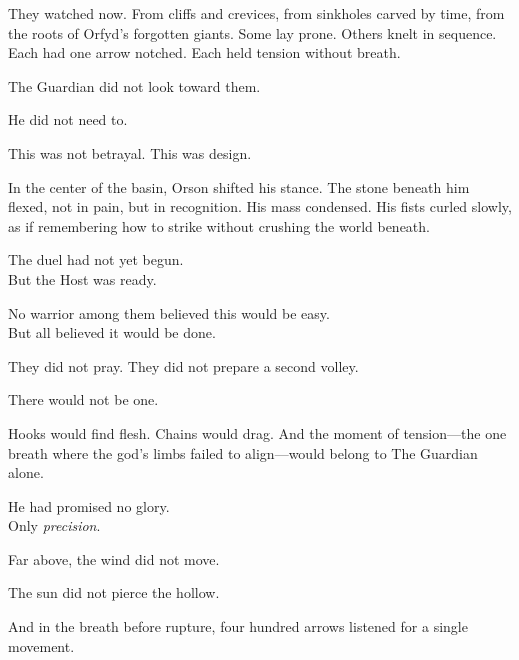 \documentclass[12pt]{article}
\begin{document}
\vspace{0.5em}
They watched now. From cliffs and crevices, from sinkholes carved by time, from the roots of Orfyd’s forgotten giants. Some lay prone. Others knelt in sequence. Each had one arrow notched. Each held tension without breath.

\vspace{0.5em}
The Guardian did not look toward them.

\vspace{0.5em}
He did not need to.

\vspace{0.5em}
This was not betrayal. This was design.

\vspace{0.5em}
In the center of the basin, Orson shifted his stance. The stone beneath him flexed, not in pain, but in recognition. His mass condensed. His fists curled slowly, as if remembering how to strike without crushing the world beneath.

\vspace{0.5em}
The duel had not yet begun.\\
But the Host was ready.

\vspace{0.5em}
No warrior among them believed this would be easy.\\
But all believed it would be done.

\vspace{0.5em}
They did not pray. They did not prepare a second volley.

\vspace{0.5em}
There would not be one.

\vspace{0.5em}
Hooks would find flesh. Chains would drag. And the moment of tension---the one breath where the god’s limbs failed to align---would belong to The Guardian alone.

\vspace{0.5em}
He had promised no glory.\\
Only \textit{precision}.

\vspace{0.5em}
Far above, the wind did not move.

\vspace{0.5em}
The sun did not pierce the hollow.

\vspace{0.5em}
And in the breath before rupture, four hundred arrows listened for a single movement.
\end{document}

